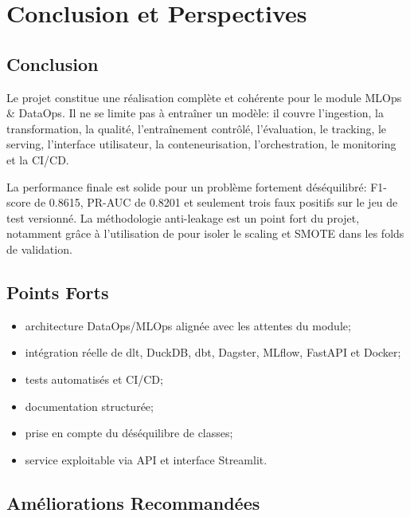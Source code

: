 \chapter{Conclusion et Perspectives}

\section{Conclusion}

Le projet  constitue une réalisation complète et cohérente pour le module MLOps \& DataOps. Il ne se limite pas à entraîner un modèle: il couvre l'ingestion, la transformation, la qualité, l'entraînement contrôlé, l'évaluation, le tracking, le serving, l'interface utilisateur, la conteneurisation, l'orchestration, le monitoring et la CI/CD.

La performance finale est solide pour un problème fortement déséquilibré: F1-score de 0.8615, PR-AUC de 0.8201 et seulement trois faux positifs sur le jeu de test versionné. La méthodologie anti-leakage est un point fort du projet, notamment grâce à l'utilisation de  pour isoler le scaling et SMOTE dans les folds de validation.

\section{Points Forts}

\begin{itemize}
    \item architecture DataOps/MLOps alignée avec les attentes du module;
    \item intégration réelle de dlt, DuckDB, dbt, Dagster, MLflow, FastAPI et Docker;
    \item tests automatisés et CI/CD;
    \item documentation structurée;
    \item prise en compte du déséquilibre de classes;
    \item service exploitable via API et interface Streamlit.
\end{itemize}

\section{Améliorations Recommandées}

